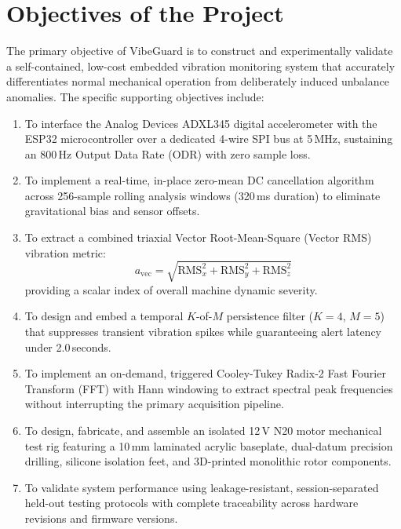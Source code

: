 \section{Objectives of the Project}
The primary objective of VibeGuard is to construct and experimentally validate a self-contained, low-cost embedded vibration monitoring system that accurately differentiates normal mechanical operation from deliberately induced unbalance anomalies. The specific supporting objectives include:
\begin{enumerate}
    \item To interface the Analog Devices ADXL345 digital accelerometer with the ESP32 microcontroller over a dedicated 4-wire SPI bus at 5\,MHz, sustaining an 800\,Hz Output Data Rate (ODR) with zero sample loss.
    \item To implement a real-time, in-place zero-mean DC cancellation algorithm across 256-sample rolling analysis windows (320\,ms duration) to eliminate gravitational bias and sensor offsets.
    \item To extract a combined triaxial Vector Root-Mean-Square (Vector RMS) vibration metric:
    \begin{equation}
    a_{\mathrm{vec}} = \sqrt{\mathrm{RMS}_x^2 + \mathrm{RMS}_y^2 + \mathrm{RMS}_z^2}
    \end{equation}
    providing a scalar index of overall machine dynamic severity.
    \item To design and embed a temporal $K$-of-$M$ persistence filter ($K=4$, $M=5$) that suppresses transient vibration spikes while guaranteeing alert latency under 2.0\,seconds.
    \item To implement an on-demand, triggered Cooley-Tukey Radix-2 Fast Fourier Transform (FFT) with Hann windowing to extract spectral peak frequencies without interrupting the primary acquisition pipeline.
    \item To design, fabricate, and assemble an isolated 12\,V N20 motor mechanical test rig featuring a 10\,mm laminated acrylic baseplate, dual-datum precision drilling, silicone isolation feet, and 3D-printed monolithic rotor components.
    \item To validate system performance using leakage-resistant, session-separated held-out testing protocols with complete traceability across hardware revisions and firmware versions.
\end{enumerate}

